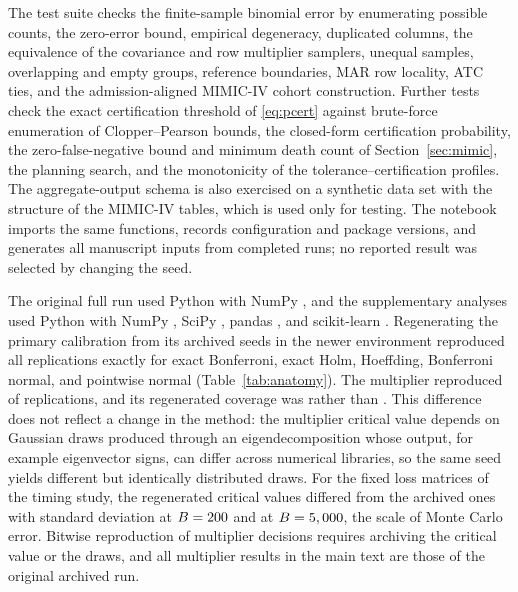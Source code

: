 \documentclass[twoside,11pt]{article}
\begin{document}
The test suite checks the finite-sample binomial error by enumerating possible counts, the
zero-error bound, empirical degeneracy, duplicated columns, the equivalence of the covariance
and row multiplier samplers, unequal samples, overlapping and empty groups, reference
boundaries, MAR row locality, ATC ties, and the admission-aligned MIMIC-IV cohort
construction. Further tests check the exact certification threshold of \eqref{eq:pcert}
against brute-force enumeration of Clopper--Pearson bounds, the closed-form certification
probability, the zero-false-negative bound and minimum death count of Section~\ref{sec:mimic},
the planning search, and the monotonicity of the tolerance--certification profiles. The
aggregate-output schema is also exercised on a synthetic data set with the structure of the
MIMIC-IV tables, which is used only for testing. The notebook imports the same functions,
records configuration and package versions, and generates all manuscript inputs from completed
runs; no reported result was selected by changing the seed.

The original full run used Python \OrigPython{} with NumPy \OrigNumpy, and the supplementary
analyses used Python \RevPython{} with NumPy \RevNumpy, SciPy \RevScipy, pandas \RevPandas, and
scikit-learn \RevSklearn. Regenerating the primary calibration from its archived seeds in the
newer environment reproduced all \AnatReps{} replications exactly for exact Bonferroni, exact
Holm, Hoeffding, Bonferroni normal, and pointwise normal (Table~\ref{tab:anatomy}). The
multiplier reproduced \AnatMultReproduced{} of \AnatReps{} replications, and its regenerated
coverage was \AnatMultCoverageRerun{} rather than \CalMultCoverage. This difference does not
reflect a change in the method: the multiplier critical value depends on Gaussian draws produced
through an eigendecomposition whose output, for example eigenvector signs, can differ across
numerical libraries, so the same seed yields different but identically distributed draws. For
the fixed loss matrices of the timing study, the regenerated critical values differed from the
archived ones with standard deviation \BootDiffSdLow{} at $B=200$ and \BootDiffSdHigh{}
at $B=5,000$, the scale of Monte Carlo error. Bitwise reproduction of multiplier
decisions requires archiving the critical value or the draws, and all multiplier results in the
main text are those of the original archived run.
\begin{table}[ht]
\centering\small\setlength{\tabcolsep}{4pt}
\caption{Decomposition of band failures in the regenerated primary calibration (\AnatReps{}
replications, $\tau=.34$). ``Reproduced'' counts replications whose coverage, certified count,
and ARR match the archived run. Band failures are split into those that missed only acceptable
environments and those that missed at least one unacceptable environment. Containment failures
are replications that certified an unacceptable environment at $\tau=.34$.}
\label{tab:anatomy}
\end{table}
\FloatBarrier
\end{document}
